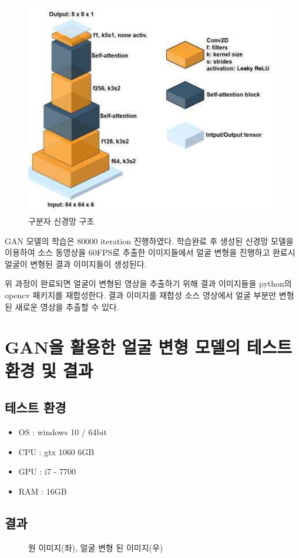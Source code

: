 \documentclass{oblivoir}
\newcommand{\spec}{
    \begin{itemize}
        \item OS : windows 10 / 64bit
        \item CPU : gtx 1060 6GB
        \item GPU : i7 - 7700
        \item RAM : 16GB
    \end{itemize}
    }
\begin{document}
\begin{enumerate}
    \begin{figure}[h!]
    \centering
    \includegraphics{pic/chp5/img906}
    \caption{구분자 신경망 구조\cite{reference11}}
    \end{figure}

    GAN 모델의 학습은 80000 iteration 진행하였다. 학습완료 후 생성된 신경망 모델을 이용하여 소스 동영상을 60FPS로 추출한 이미지들에서 얼굴 변형을 진행하고 완료시 얼굴이 변형된 결과 이미지들이 생성된다.

    위 과정이 완료되면 얼굴이 변형된 영상을 추출하기 위해 결과 이미지들을 python의 opencv 패키지를 재합성한다. 결과 이미지를 재합성 소스 영상에서 얼굴 부분만 변형된 새로운 영상을 추출할 수 있다.
\end{enumerate}

    \section{ GAN을 활용한 얼굴 변형 모델의 테스트 환경 및 결과}

    \subsection{테스트 환경}
    \spec
    \subsection{결과}
    \begin{figure}[h!]
    \centering
    \caption{원 이미지(좌), 얼굴 변형 된 이미지(우)}
    \end{figure}
\end{document}
